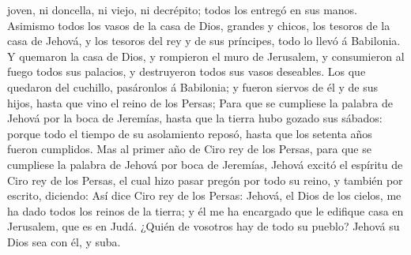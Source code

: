 joven, ni doncella, ni viejo, ni decrépito; todos los entregó en sus
manos.  Asimismo todos los vasos de la casa de Dios,
grandes y chicos, los tesoros de la casa de Jehová, y los tesoros del
rey y de sus príncipes, todo lo llevó á Babilonia.  Y
quemaron la casa de Dios, y rompieron el muro de Jerusalem, y
consumieron al fuego todos sus palacios, y destruyeron todos sus vasos
deseables.  Los que quedaron del cuchillo, pasáronlos á
Babilonia; y fueron siervos de él y de sus hijos, hasta que vino el
reino de los Persas;  Para que se cumpliese la palabra de
Jehová por la boca de Jeremías, hasta que la tierra hubo gozado sus
sábados: porque todo el tiempo de su asolamiento reposó, hasta que los
setenta años fueron cumplidos.  Mas al primer año de Ciro
rey de los Persas, para que se cumpliese la palabra de Jehová por boca
de Jeremías, Jehová excitó el espíritu de Ciro rey de los Persas, el
cual hizo pasar pregón por todo su reino, y también por escrito,
diciendo:  Así dice Ciro rey de los Persas: Jehová, el Dios
de los cielos, me ha dado todos los reinos de la tierra; y él me ha
encargado que le edifique casa en Jerusalem, que es en Judá. ¿Quién de
vosotros hay de todo su pueblo? Jehová su Dios sea con él, y suba.

